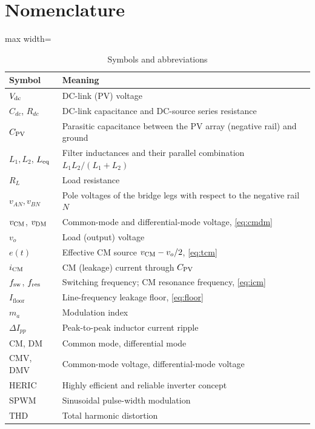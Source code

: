 \section{Nomenclature}
\label{app:nom}
\begin{table}[!t]
\renewcommand{\arraystretch}{1.05}
\caption{Symbols and abbreviations}
\label{tab:nom}
\centering
\footnotesize
\begin{adjustbox}{max width=\columnwidth}
\begin{tabular}{p{1.8cm}p{6.0cm}}
\toprule
Symbol & Meaning \\
\midrule
$V_{\mathrm{dc}}$ & DC-link (PV) voltage \\
$C_{dc}$, $R_{dc}$ & DC-link capacitance and DC-source series resistance \\
$C_{\mathrm{PV}}$ & Parasitic capacitance between the PV array (negative rail) and ground \\
$L_1,L_2$, $L_{\mathrm{eq}}$ & Filter inductances and their parallel combination $L_1L_2/(L_1+L_2)$ \\
$R_L$ & Load resistance \\
$v_{AN},v_{BN}$ & Pole voltages of the bridge legs with respect to the negative rail $N$ \\
$v_{\mathrm{CM}}$, $v_{\mathrm{DM}}$ & Common-mode and differential-mode voltage, \eqref{eq:cmdm} \\
$v_o$ & Load (output) voltage \\
$e(t)$ & Effective CM source $v_{\mathrm{CM}}-v_o/2$, \eqref{eq:tcm} \\
$i_{\mathrm{CM}}$ & CM (leakage) current through $C_{\mathrm{PV}}$ \\
$f_{\mathrm{sw}}$, $f_{\mathrm{res}}$ & Switching frequency; CM resonance frequency, \eqref{eq:icm} \\
$I_{\mathrm{floor}}$ & Line-frequency leakage floor, \eqref{eq:floor} \\
$m_a$ & Modulation index \\
$\Delta I_{pp}$ & Peak-to-peak inductor current ripple \\
\midrule
CM, DM & Common mode, differential mode \\
CMV, DMV & Common-mode voltage, differential-mode voltage \\
HERIC & Highly efficient and reliable inverter concept \\
SPWM & Sinusoidal pulse-width modulation \\
THD & Total harmonic distortion \\
\bottomrule
\end{tabular}
\end{adjustbox}
\end{table}
